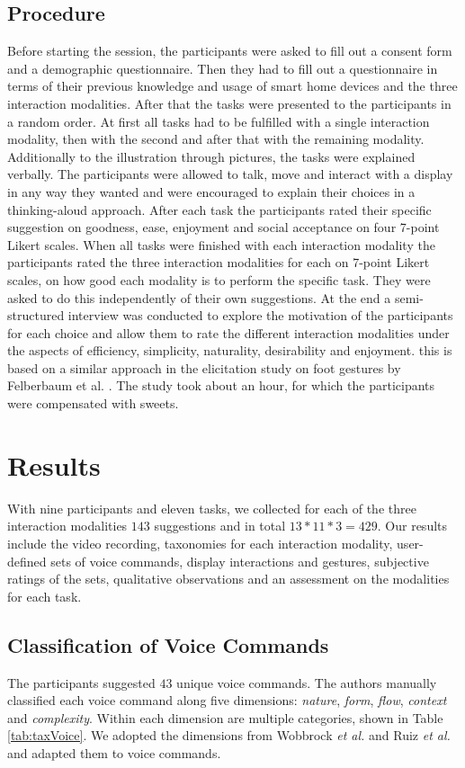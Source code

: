 \documentclass[sigchi]{acmart}
\begin{document}
	\subsection{Procedure}
	Before starting the session, the participants were asked to fill out a consent form and a demographic questionnaire. Then they had to fill out a questionnaire in terms of their previous knowledge and usage of smart home devices and the three interaction modalities. After that the tasks were presented to the participants in a random order. At first all tasks had to be fulfilled with a single interaction modality, then with the second and after that with the remaining modality. Additionally to the illustration through pictures, the tasks were explained verbally. The participants were allowed to talk, move and interact with a display in any way they wanted and were encouraged to explain their choices in a thinking-aloud approach. After each task the participants rated their specific suggestion on goodness, ease, enjoyment and social acceptance on four 7-point Likert scales. When all tasks were finished with each interaction modality the participants rated the three interaction modalities for each on 7-point Likert scales, on how good each modality is to perform the specific task. They were asked to do this independently of their own suggestions. At the end a semi-structured interview was conducted to explore the motivation of the participants for each choice and allow them to rate the different interaction modalities under the aspects of efficiency, simplicity, naturality, desirability and enjoyment. this is based on a similar approach in the elicitation study on foot gestures by Felberbaum et al. \cite{Felberbaum.2018}. The study took about an hour, for which the participants were compensated with sweets.
	
	\section{Results}
	With nine participants and eleven tasks, we collected for each of the three interaction modalities $143$ suggestions and in total $13*11*3=429$. Our results include the video recording, taxonomies for each interaction modality, user-defined sets of voice commands, display interactions and gestures, subjective ratings of the sets, qualitative observations and an assessment on the modalities for each task. 
	
	\subsection{Classification of Voice Commands}
	The participants suggested $43$ unique voice commands. The authors manually classified each voice command along five dimensions: \textit{nature}, \textit{form}, \textit{flow}, \textit{context} and \textit{complexity}. Within each dimension are multiple categories, shown in Table \ref{tab:taxVoice}. We adopted the dimensions from Wobbrock \textit{et al.} \citep{Wobbrock.2009} and Ruiz \textit{et al.} \citep{Ruiz.2011} and adapted them to voice commands. 
	
\end{document}
